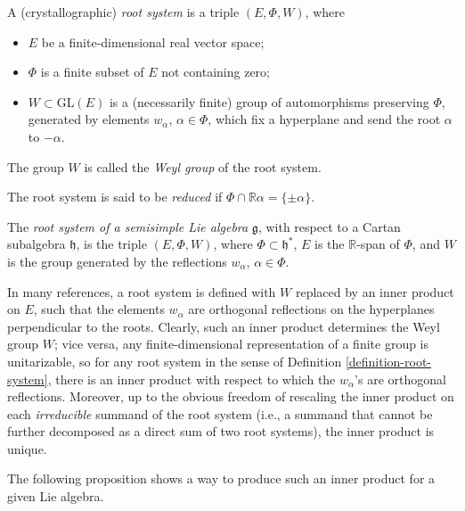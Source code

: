 \begin{definition}
 \label{definition-root-system}
A (crystallographic) {\it root system} is a triple $(E,\Phi, W)$, where 
\begin{itemize} \item $E$ be a finite-dimensional real vector space;
 \item $\Phi$ is a finite subset of $E$ not containing zero;
 \item $W \subset \text{GL}(E)$ is a (necessarily finite) group of automorphisms preserving $\Phi$,
 generated by elements $w_\alpha$, $\alpha\in \Phi$, which fix a hyperplane and send the root $\alpha$ to $-\alpha$. 
\end{itemize}

The group $W$ is called the {\it Weyl group} of the root system.

The root system is said to be {\it reduced} if $\Phi\cap \mathbb R\alpha = \{\pm \alpha\}$. 
\end{definition}

\begin{definition}
 \label{definition-rootsystem-ofLiealgebra}
The {\it root system of a semisimple Lie algebra} $\mathfrak g$, with respect to a Cartan subalgebra $\mathfrak h$, is the triple $(E,\Phi,W)$, where $\Phi\subset \mathfrak h^*$, $E$ is the $\mathbb R$-span of $\Phi$, and $W$ is the group generated by the reflections $w_\alpha$, $\alpha\in \Phi$.
\end{definition}


\begin{remark}
 \label{remark-definition-rootsystem}
In many references, a root system is defined with $W$ replaced by an inner product on $E$, such that the elements $w_\alpha$ are orthogonal reflections on the hyperplanes perpendicular to the roots. Clearly, such an inner product determines the Weyl group $W$; vice versa, any finite-dimensional representation of a finite group is unitarizable, so for any root system in the sense of Definition \ref{definition-root-system}, there is an inner product with respect to which the $w_\alpha$'s are orthogonal reflections. Moreover, up to the obvious freedom of rescaling the inner product on each \emph{irreducible} summand of the root system (i.e., a summand that cannot be further decomposed as a direct sum of two root systems), the inner product is unique.

The following proposition shows a way to produce such an inner product for a given Lie algebra.
\end{remark}

